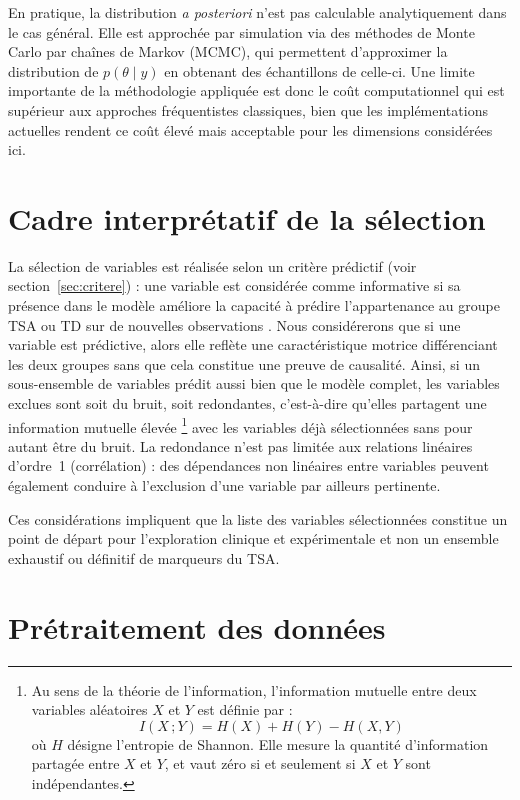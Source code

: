 En pratique, la distribution \textit{a posteriori} n'est pas calculable analytiquement dans le cas général. Elle est approchée par simulation via des méthodes de Monte Carlo par chaînes de Markov (MCMC), qui permettent d'approximer la distribution de $p(\theta \mid y)$ en obtenant des échantillons de celle-ci. Une limite importante de la méthodologie appliquée est donc le coût computationnel qui est supérieur aux approches fréquentistes classiques, bien que les implémentations actuelles rendent ce coût élevé mais acceptable pour les dimensions considérées ici.


 
 \section{Cadre interprétatif de la sélection}
 La sélection de variables est réalisée selon un critère prédictif (voir section~\ref{sec:critere}) : une variable est considérée comme informative si sa présence dans le modèle améliore la capacité à prédire l'appartenance au groupe TSA ou TD sur de nouvelles observations \parencite{projpred}. Nous considérerons que si une variable est prédictive, alors elle reflète une caractéristique motrice différenciant les deux groupes sans que cela constitue une preuve de causalité. Ainsi, si un sous-ensemble de variables prédit aussi bien que le modèle complet, les variables exclues sont soit du bruit, soit redondantes, c'est-à-dire qu'elles partagent une information mutuelle 
 élevée \footnote{
 	Au sens de la théorie de l'information, l'information mutuelle entre deux variables aléatoires 
 	$X$ et $Y$ est définie par :
 	\[
 	I(X\,;Y) = H(X) + H(Y) - H(X,Y)
 	\]
 	où $H$ désigne l'entropie de Shannon. Elle mesure la quantité d'information partagée entre $X$ et $Y$, et vaut zéro si et seulement si $X$ et $Y$ sont indépendantes.
 } avec les variables déjà sélectionnées sans pour autant être du bruit. La redondance n'est pas limitée aux relations linéaires d'ordre~1 (corrélation) : des dépendances non linéaires entre variables peuvent également conduire à l'exclusion d'une variable par ailleurs pertinente.

\medskip 

 Ces considérations impliquent que la liste des variables sélectionnées constitue un point de départ pour l'exploration clinique et expérimentale et non un ensemble exhaustif ou définitif de marqueurs du TSA. 

\section{Prétraitement des données}

